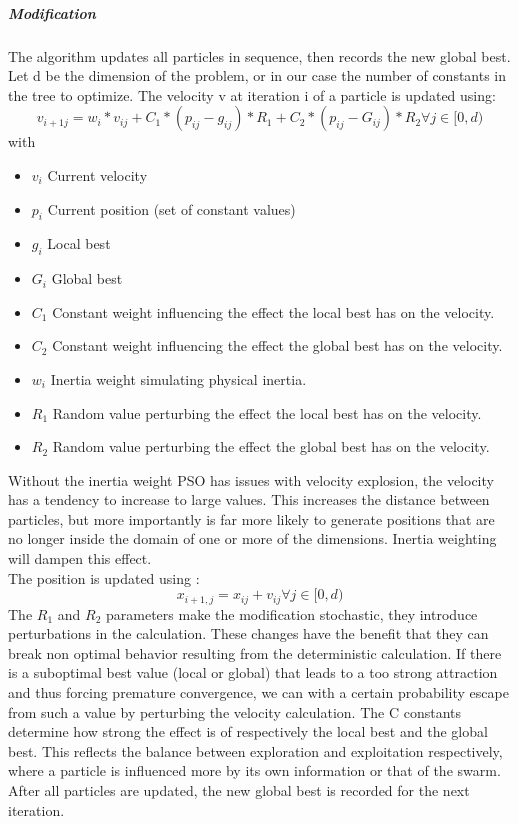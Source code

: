 \subparagraph{Modification}\label{subppsomodification}
The algorithm updates all particles in sequence, then records the new global best.
Let d be the dimension of the problem, or in our case the number of constants in the tree to optimize.
The velocity v at iteration i of a particle is updated using:
\[
v_{i+1 j} = w_i * v_{ij} + C_1 * (p_{ij} - g_{ij}) * R_1 + C_2 * (p_{ij} - G_{ij}) * R_2 \forall j \in [0, d)
\]
with
\begin{itemize}
\item $v_i$ Current velocity
\item $p_i$ Current position (set of constant values)
\item $g_i$ Local best
\item $G_i$ Global best
\item $C_1$ Constant weight influencing the effect the local best has on the velocity.
\item $C_2$ Constant weight influencing the effect the global best has on the velocity.
\item $w_i$ Inertia weight simulating physical inertia.
\item $R_1$ Random value perturbing the effect the local best has on the velocity.
\item $R_2$ Random value perturbing the effect the global best has on the velocity.
\end{itemize}
Without the inertia weight PSO has issues with velocity explosion, the velocity has a tendency to increase to large values. This increases the distance between particles, but more importantly is far more likely to generate positions that are no longer inside the domain of one or more of the dimensions. Inertia weighting will dampen this effect. 
\\
The position is updated using :
\[
x_{i+1,j} = x_{ij} + v_{ij} \forall j \in [0, d)
\]
The $R_1$ and $R_2$ parameters make the modification stochastic, they introduce perturbations in the calculation. These changes have the benefit that they can break non optimal behavior resulting from the deterministic calculation. If there is a suboptimal best value (local or global) that leads to a too strong attraction and thus forcing premature convergence, we can with a certain probability escape from such a value by perturbing the velocity calculation. The C constants determine how strong the effect is of respectively the local best and the global best. This reflects the balance between exploration and exploitation respectively, where a particle is influenced more by its own information or that of the swarm.
After all particles are updated, the new global best is recorded for the next iteration.


